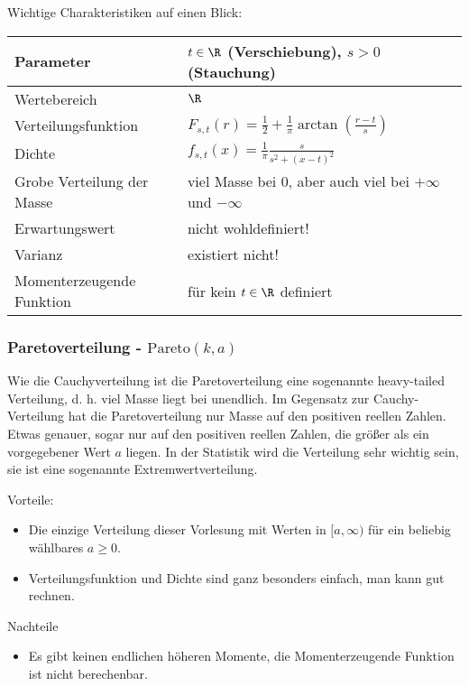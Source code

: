 Wichtige Charakteristiken auf einen Blick:
\begin{center}
\begin{tabular}[h]{|l|l|}
\hline
Parameter& $t\in \R$ (Verschiebung), $s>0$ (Stauchung)\\
\hline
Wertebereich & $\R$\\
\hline
Verteilungsfunktion & $F_{s,t}(r)= \frac{1}{2}+\frac{1}{\pi} \arctan(\frac{r-t}{s})$\\
\hline
Dichte & $f_{s,t} (x)=\frac{1}{\pi}\frac{s}{s^2+(x-t)^2}$\\
\hline
Grobe Verteilung der Masse & viel Masse bei $0$, aber auch viel bei $+\infty$ und $-\infty$\\
\hline
Erwartungswert& nicht wohldefiniert! \\
\hline
Varianz & existiert nicht!\\
\hline
Momenterzeugende Funktion& f\"ur kein $t\in\R$ definiert\\
\hline
\end{tabular}
\end{center}


\subsubsection*{Paretoverteilung - $\text{Pareto}(k,a)$}
Wie die Cauchyverteilung ist die Paretoverteilung eine sogenannte \glqq heavy-tailed\grqq{} Verteilung, d. h. viel Masse liegt bei unendlich. Im Gegensatz zur Cauchy-Verteilung hat die Paretoverteilung nur Masse auf den positiven reellen Zahlen. Etwas genauer, sogar nur auf den positiven reellen Zahlen, die gr\"o\ss er als ein vorgegebener Wert $a$ liegen. In der Statistik wird die Verteilung sehr wichtig sein, sie ist eine sogenannte Extremwertverteilung.

{Vorteile:} 
\begin{itemize}
\item Die einzige Verteilung dieser Vorlesung mit Werten in $[a,\infty)$ f\"ur ein beliebig w\"ahlbares $a\geq 0$. 
\item Verteilungsfunktion und Dichte sind ganz besonders einfach, man kann gut rechnen.
\end{itemize}

{Nachteile}
\begin{itemize}
	\item Es gibt keinen endlichen h\"oheren Momente, die Momenterzeugende Funktion ist nicht berechenbar.
\end{itemize}

